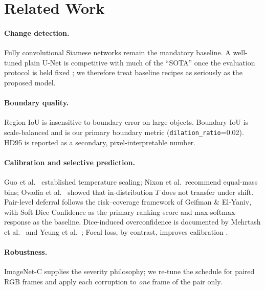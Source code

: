 \section{Related Work}
\label{sec:related}

\paragraph{Change detection.}
Fully convolutional Siamese networks \cite{daudt_2018_fcsiam} remain
the mandatory baseline. A well-tuned plain U-Net is competitive with
much of the ``SOTA'' once the evaluation protocol is held fixed
\cite{corley_2024_reality}; we therefore treat baseline recipes as
seriously as the proposed model.

\paragraph{Boundary quality.}
Region IoU is insensitive to boundary error on large objects.
Boundary IoU \cite{cheng_2021_boundaryiou} is scale-balanced and is
our primary boundary metric (\texttt{dilation\_ratio}=0.02). HD95 is
reported as a secondary, pixel-interpretable number.

\paragraph{Calibration and selective prediction.}
Guo et al.\ \cite{guo_2017_calibration} established temperature
scaling; Nixon et al.\ recommend equal-mass bins; Ovadia et al.\
\cite{ovadia_2019_shift} showed that in-distribution $T$ does not
transfer under shift. Pair-level deferral follows the risk--coverage
framework of Geifman \& El-Yaniv, with Soft Dice Confidence
\cite{gauthier_2024_sdc} as the primary ranking score and
max-softmax-response as the baseline. Dice-induced overconfidence is
documented by Mehrtash et al.\ \cite{mehrtash_2020_calibration} and
Yeung et al.\ \cite{yeung_2023_dscpp}; Focal loss, by contrast,
improves calibration \cite{mukhoti_2020_focal}.

\paragraph{Robustness.}
ImageNet-C \cite{hendrycks_2019_imagenetc} supplies the severity
philosophy; we re-tune the schedule for paired RGB frames and apply
each corruption to \emph{one} frame of the pair only.
